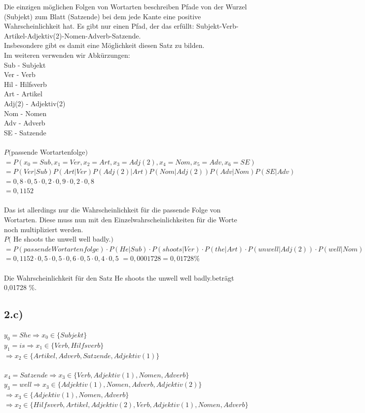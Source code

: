 \documentclass[a4paper]{article}
\begin{document}
Die einzigen möglichen Folgen von Wortarten beschreiben Pfade von der Wurzel (Subjekt) zum Blatt (Satzende) bei dem jede Kante eine positive Wahrscheinlichkeit hat.
Es gibt nur einen Pfad, der das erf\"ullt: Subjekt-Verb-Artikel-Adjektiv(2)-Nomen-Adverb-Satzende. \\
Insbesondere gibt es damit eine M\"oglichkeit diesen Satz zu bilden. \\
Im weiteren verwenden wir Abkürzungen:  \\
Sub - Subjekt \\
Ver - Verb \\
Hil - Hilfsverb \\
Art - Artikel \\
Adj(2) - Adjektiv(2) \\
Nom - Nomen \\
Adv - Adverb \\
SE - Satzende \\
\\
$P($passende Wortartenfolge$)$
$= P(x_0=Sub, x_1=Ver, x_2= Art, x_3=Adj(2), x_4=Nom, x_5=Adv, x_6=SE)$ \\
$= P(Ver | Sub)  P(Art | Ver) P(Adj(2) | Art) P(Nom | Adj(2)) P(Adv | Nom) P(SE | Adv)$ \\
$= 0,8 \cdot 0,5 \cdot 0,2 \cdot 0,9 \cdot 0,2 \cdot 0,8$ \\
$= 0,1152$ \\
\\
Das ist allerdings nur die Wahrscheinlichkeit für die passende Folge von Wortarten. Diese muss nun mit den Einzelwahrscheinlichkeiten für die Worte noch multipliziert werden. \\
$P($ \glqq He shoots the unwell well badly.\grqq $)$ \\
$= P(passende Wortartenfolge) \cdot P(He | Sub) \cdot P(shoots | Ver) \cdot P(the | Art) \cdot P(unwell | Adj(2)) \cdot P(well | Nom) \cdot P(badly | Adv)$ \\
$= 0,1152 \cdot 0,5 \cdot 0,5 \cdot 0,6 \cdot 0,5 \cdot 0,4 \cdot 0,5$
$= 0,0001728 = 0,01728 \%$ \\
\\
Die Wahrscheinlichkeit f\"ur den Satz \glqq He shoots the unwell well badly.\grqq betr\"agt 0,01728 \%.

\subsection*{2.c)}
$y_0 = She \Rightarrow x_0 \in \{Subjekt\}$ \\
$y_1 = is \Rightarrow x_1 \in \{Verb, Hilfsverb\}$ \\
$\Rightarrow x_2 \in \{Artikel, Adverb, Satzende, Adjektiv(1)\}$ \\
\\
$x_4 = Satzende \Rightarrow x_3 \in \{Verb, Adjektiv(1), Nomen, Adverb\}$ \\
$y_3 = well \Rightarrow x_3 \in \{Adjektiv(1), Nomen, Adverb, Adjektiv(2)\}$ \\
$\Rightarrow x_3 \in \{Adjektiv(1), Nomen, Adverb\}$ \\
$\Rightarrow x_2 \in \{Hilfsverb, Artikel, Adjektiv(2), Verb, Adjektiv(1), Nomen, Adverb\}$ \\
\end{document}
